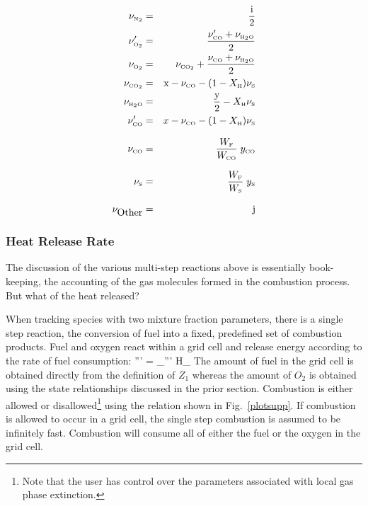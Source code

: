 \documentclass[11pt]{book}
\begin{document}
\begin{eqnarray}  \nu_{\tiny \hbox{N}_2}  &=& \frac{\hbox{i}}{2}\\*[.in]
                  \nu_{\tiny \hbox{O}_2}' &=& \frac{\nu_{\tiny \hbox{CO}}'+\nu_{\tiny \hbox{H}_2\hbox{O}}}{2}\\*[.in]
                  \nu_{\tiny \hbox{O}_2}  &=& \nu_{\tiny \hbox{CO}_2} + \frac{\nu_{\tiny \hbox{CO}}+\nu_{\tiny \hbox{H}_2\hbox{O}}}{2}\\*[.in]
                  \nu_{\tiny \hbox{CO}_2} &=& \hbox{x} - \nu_{\tiny \hbox{CO}} - (1-X_{\tiny \hbox{H}}) \nu_{\tiny \hbox{S}} \\*[.in]
                  \nu_{\tiny \hbox{H}_2\hbox{O}} &=& \frac{\hbox{y}}{2}- X_{\tiny \hbox{H}} \nu_{\tiny \hbox{S}}\\*[.in]
                  \nu_{\tiny \hbox{CO}}'   &=& x - \nu_{\tiny \hbox{CO}} - (1-X_{\tiny \hbox{H}}) \nu_{\tiny \hbox{S}} \\*[.1in]
                  \nu_{\tiny \hbox{CO}}    &=& \frac{W_{\tiny \hbox{F}}}{W_{\tiny \hbox{CO}}} \; y_{\tiny \hbox{CO}} \\*[.1in]
                  \nu_{\tiny \hbox{S}}    &=& \frac{W_{\tiny \hbox{F}}}{W_{\tiny \hbox{S}}} \; y_{\tiny \hbox{S}} \\*[.1in]
                  \nu_{\hbox{Other}} &=& \hbox{j}
\end{eqnarray}

\subsubsection{Heat Release Rate}

The discussion of the various multi-step reactions above is essentially book-keeping, the accounting of the gas
molecules formed in the combustion process. But what of the heat released?

When tracking species with two mixture fraction parameters, there is a single step reaction, the conversion of fuel into a
fixed, predefined set of combustion products.  Fuel and oxygen react within a grid cell and release energy according to
the rate of fuel consumption:
\be \dq''' = \dm_\F''' \Delta H_{\F} \ee
The amount of fuel in the grid cell is obtained directly from the definition of $Z_1$ whereas the amount of $O_2$ is
obtained using the state relationships discussed in the prior section.  Combustion is either allowed or
disallowed\footnote{Note that the user has control over the parameters associated with local gas phase extinction.}
using the relation shown in Fig.~\ref{plotsupp}.
If combustion is allowed to occur in a grid
cell, the single step combustion is assumed to be
infinitely fast.  Combustion will consume all of either the fuel or the oxygen in the grid cell.
\end{document}
